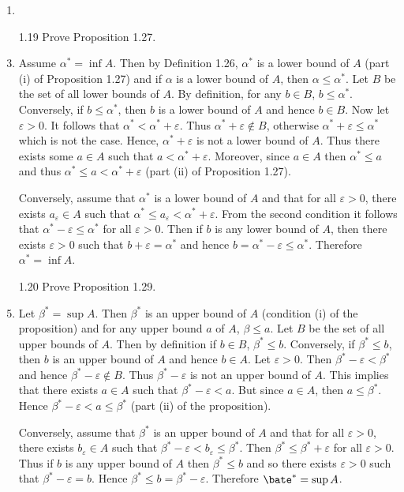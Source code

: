 \documentclass[12pt]{article}
\makeatletter
\theoremstyle{definition}
\theoremstyle{remark}
\renewenvironment{proof}[1][\proofname]{\par
  \pushQED{\qed}%
  \normalfont \topsep6\p@\@plus6\p@\relax
  \list{}{\leftmargin=0mm
          \rightmargin=4mm
          \settowidth{\itemindent}{\itshape#1}%
          \labelwidth=\itemindent
          \parsep=0pt \listparindent=\parindent 
  }
  \item[\hskip\labelsep
        \itshape
    #1\@addpunct{.}]\ignorespaces
}{%
  \popQED\endlist\@endpefalse
}
\let\oldproofname=\proofname
\renewcommand{\proofname}{\bf{\textit{\oldproofname}}}
\makeatother
\begin{document}
\begin{enumerate}[leftmargin=*]
\begin{proof}
            \end{proof}\newpage
        \item[1.19] Prove Proposition 1.27.
            \begin{proof}
                Assume $\alpha^*=\inf A$. Then by Definition 1.26, $\alpha^*$ is a lower bound of $A$ (part (i) of Proposition 1.27) and if $\alpha$ is a lower bound of $A$, then $\alpha\leq\alpha^*$. Let $B$ be the set of all lower bounds of $A$. By definition, for any $b\in B$, $b\leq\alpha^*$. Conversely, if $b\leq\alpha^*$, then $b$ is a lower bound of $A$ and hence $b\in B$. Now let $\varepsilon>0$. It follows that $\alpha^*<\alpha^*+\varepsilon$. Thus $\alpha^*+\varepsilon\notin B$, otherwise $\alpha^*+\varepsilon\leq\alpha^*$ which is not the case. Hence, $\alpha^*+\varepsilon$ is not a lower bound of $A$. Thus there exists some $a\in A$ such that $a<\alpha^*+\varepsilon$. Moreover, since $a\in A$ then $\alpha^*\leq a$ and thus $\alpha^*\leq a<\alpha^*+\varepsilon$ (part (ii) of Proposition 1.27).\par\hspace{4mm} Conversely, assume that $\alpha^*$ is a lower bound of $A$ and that for all $\varepsilon>0$, there exists $a_{\varepsilon}\in A$ such that $\alpha^*\leq a_{\varepsilon}<\alpha^*+\varepsilon$. From the second condition it follows that $\alpha^*-\varepsilon\leq\alpha^*$ for all $\varepsilon>0$. Then if $b$ is any lower bound of $A$, then there exists $\varepsilon>0$ such that $b+\varepsilon=\alpha^*$ and hence $b=\alpha^*-\varepsilon\leq\alpha^*$. Therefore $\alpha^*=\inf A$.
            \end{proof}
        \item[1.20] Prove Proposition 1.29.
            \begin{proof}
                Let $\beta^*=\sup A$. Then $\beta^*$ is an upper bound of $A$ (condition (i) of the proposition) and for any upper bound $a$ of $A$, $\beta\leq a$. Let $B$ be the set of all upper bounds of $A$. Then by definition if $b\in B$, $\beta^*\leq b$. Conversely, if $\beta^*\leq b$, then $b$ is an upper bound of $A$ and hence $b\in A$. Let $\varepsilon>0$. Then $\beta^*-\varepsilon<\beta^*$ and hence $\beta^*-\varepsilon\notin B$. Thus $\beta^*-\varepsilon$ is not an upper bound of $A$. This implies that there exists $a\in A$ such that $\beta^*-\varepsilon<a$. But since $a\in A$, then $a\leq\beta^*$. Hence $\beta^*-\varepsilon<a\leq\beta^*$ (part (ii) of the proposition).\par\hspace{4mm} Conversely, assume that $\beta^*$ is an upper bound of $A$ and that for all $\varepsilon>0$, there exists $b_{\varepsilon}\in A$ such that $\beta^*-\varepsilon<b_{\varepsilon}\leq\beta^*$. Then $\beta^*\leq\beta^*+\varepsilon$ for all $\varepsilon>0$. Thus if $b$ is any upper bound of $A$ then $\beta^*\leq b$ and so there exists $\varepsilon>0$ such that $\beta^*-\varepsilon=b$. Hence $\beta^*\leq b=\beta^*-\varepsilon$. Therefore $\bate^*=\sup A$.

\end{proof}
\end{enumerate}
\end{document}
